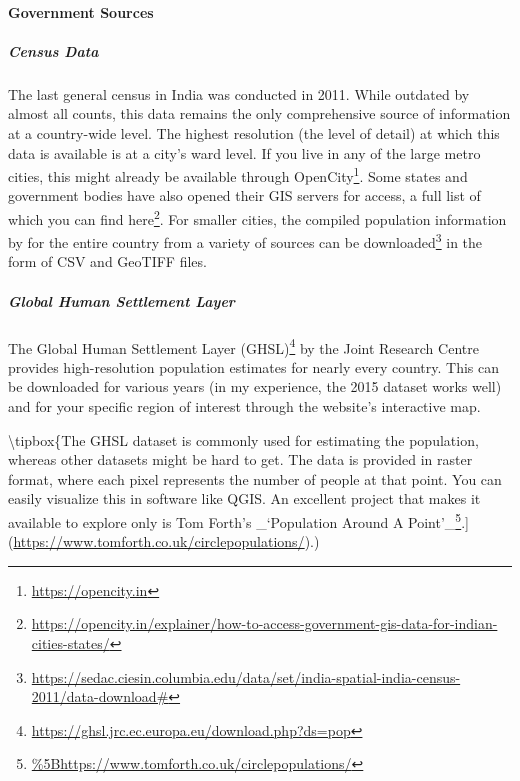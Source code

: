 \documentclass[
]{latex/krantz}
\renewcommand{\href}[2]{#2\footnote{\url{#1}}}
\DeclareRobustCommand{\href}[2]{#2\footnote{\url{#1}}}
\begin{document}
\hypertarget{government-sources}{%
\paragraph*{Government Sources}\label{government-sources}}

\hypertarget{census-data}{%
\subparagraph*{Census Data}\label{census-data}}

The last general census in India was conducted in 2011. While outdated by almost all counts, this data remains the only comprehensive source of information at a country-wide level. The highest resolution (the level of detail) at which this data is available is at a city's ward level. If you live in any of the large metro cities, this might already be available through \href{https://opencity.in}{OpenCity}. Some states and government bodies have also opened their GIS servers for access, a full list of which you can find \href{https://opencity.in/explainer/how-to-access-government-gis-data-for-indian-cities-states/}{here}. For smaller cities, the compiled population information by \autocite{balkSpatialData20112020} for the entire country from a variety of sources can be \href{https://sedac.ciesin.columbia.edu/data/set/india-spatial-india-census-2011/data-download\#}{downloaded} in the form of CSV and GeoTIFF files.

\hypertarget{global-human-settlement-layer}{%
\subparagraph*{Global Human Settlement Layer}\label{global-human-settlement-layer}}

The \href{https://ghsl.jrc.ec.europa.eu/download.php?ds=pop}{Global Human Settlement Layer (GHSL)} by the Joint Research Centre provides high-resolution population estimates for nearly every country. This can be downloaded for various years (in my experience, the 2015 dataset works well) and for your specific region of interest through the website's interactive map.

\textbackslash tipbox\{The GHSL dataset is commonly used for estimating the population, whereas other datasets might be hard to get. The data is provided in raster format, where each pixel represents the number of people at that point. You can easily visualize this in software like QGIS. An excellent project that makes it available to explore only is Tom Forth's \href{\%5Bhttps://www.tomforth.co.uk/circlepopulations/}{\_`Population Around A Point'\_}.{]}(\url{https://www.tomforth.co.uk/circlepopulations/}).)
\end{document}
